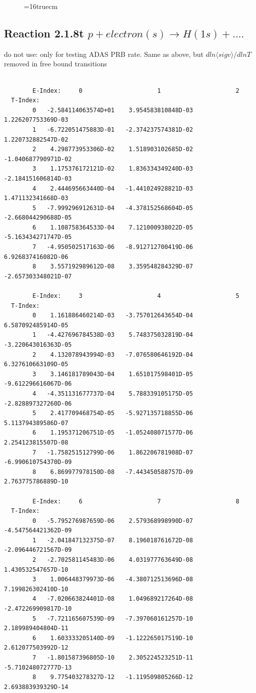 \documentclass[12pt,dvips]{article}
\begin{document}
\begin{figure} \label{2.1.8r}
\epsfxsize=16truecm
\end{figure}
\newpage

\subsection{
  Reaction 2.1.8t $p + electron(s)  \rightarrow H(1s) + ....$
}
     do not use: only for testing  ADAS PRB rate. Same as above,
     but $dln\langle sig v\rangle /dlnT$ removed in free bound transitions

\begin{small}\begin{verbatim}

        E-Index:     0                     1                     2
  T-Index:
        0   -2.584114063574D+01    3.954583810848D-03    1.226207753369D-03
        1   -6.722051475883D-01   -2.374237574381D-02    1.220732882547D-02
        2    4.298773953306D-02    1.518903102685D-02   -1.040687790971D-02
        3    1.175376172121D-02    1.836334349240D-03   -2.184151606814D-03
        4    2.444695663440D-04   -1.441024928821D-03    1.471132341668D-03
        5   -7.999296912631D-04   -4.378152568604D-05   -2.668044290688D-05
        6    1.108758364533D-04    7.121000938022D-05   -5.163434271747D-05
        7   -4.950502517163D-06   -8.912712700419D-06    6.926837416082D-06
        8    3.557192989612D-08    3.359548284329D-07   -2.657303348021D-07

        E-Index:     3                     4                     5
  T-Index:
        0    1.161886460214D-03   -3.757012643654D-04    6.587092485914D-05
        1   -4.427696784538D-03    5.748375032819D-04   -3.220643016363D-05
        2    4.132078943994D-03   -7.076580646192D-04    6.327610663109D-05
        3    3.146181789043D-04    1.651017598401D-05   -9.612296616067D-06
        4   -4.351131677737D-04    5.788339105175D-05   -2.828897327260D-06
        5    2.417709468754D-05   -5.927135718855D-06    5.113794389586D-07
        6    1.195371206751D-05   -1.052408071577D-06    2.254123815507D-08
        7   -1.758251512799D-06    1.862206781908D-07   -6.990610754370D-09
        8    6.869977978150D-08   -7.443450588757D-09    2.763775786889D-10

        E-Index:     6                     7                     8
  T-Index:
        0   -5.795276987659D-06    2.579368998990D-07   -4.547564421362D-09
        1   -2.041847132375D-07    8.196018761672D-08   -2.096446721567D-09
        2   -2.702581145483D-06    4.031977763649D-08    1.430532547657D-10
        3    1.006448379973D-06   -4.380712513696D-08    7.199826302410D-10
        4   -7.020663824401D-08    1.049689217264D-08   -2.472269909817D-10
        5   -7.721165607539D-09   -7.397060161257D-10    2.189989404804D-11
        6    1.603333205140D-09   -1.122265017519D-10    2.612077503992D-12
        7   -1.801587396805D-10    2.305224523251D-11   -5.710248072777D-13
        8    9.775403278327D-12   -1.119509805266D-12    2.693883939329D-14


\end{verbatim}
\end{small}
\end{document}
